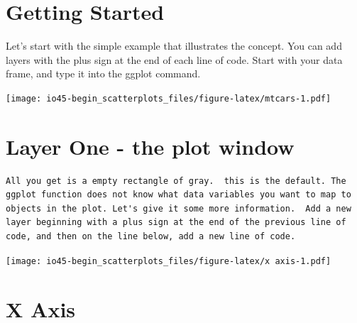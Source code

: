 \documentclass[
]{book}
\newenvironment{Shaded}{\begin{snugshade}}{\end{snugshade}}
\newcommand{\DataTypeTok}[1]{\textcolor[rgb]{0.13,0.29,0.53}{#1}}
\newcommand{\KeywordTok}[1]{\textcolor[rgb]{0.13,0.29,0.53}{\textbf{#1}}}
\newcommand{\NormalTok}[1]{#1}
\newcommand{\OperatorTok}[1]{\textcolor[rgb]{0.81,0.36,0.00}{\textbf{#1}}}
\newcommand{\StringTok}[1]{\textcolor[rgb]{0.31,0.60,0.02}{#1}}
\begin{document}
\hypertarget{getting-started}{%
\chapter{Getting Started}\label{getting-started}}

Let's start with the simple example that illustrates the concept. You can add layers with the plus sign at the end of each line of code.
Start with your data frame, and type it into the ggplot command.

\begin{Shaded}
\end{Shaded}

\texttt{[image: io45-begin\_scatterplots\_files/figure-latex/mtcars-1.pdf]}

\hypertarget{layer-one---the-plot-window}{%
\chapter{Layer One - the plot window}\label{layer-one---the-plot-window}}

\begin{verbatim}
All you get is a empty rectangle of gray.  this is the default. The ggplot function does not know what data variables you want to map to objects in the plot. Let's give it some more information.  Add a new layer beginning with a plus sign at the end of the previous line of code, and then on the line below, add a new line of code.
\end{verbatim}

\begin{Shaded}
\end{Shaded}

\texttt{[image: io45-begin\_scatterplots\_files/figure-latex/x axis-1.pdf]}

\hypertarget{x-axis}{%
\chapter{X Axis}\label{x-axis}}
\end{document}
